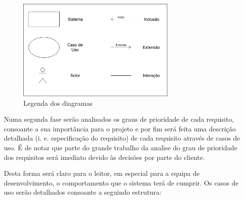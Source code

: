 \begin{figure}[ht!]
	\begin{center}
		\includegraphics[width=0.7\textwidth]{img/rf/legenda}
		\caption{Legenda dos diagramas}
		\label{fig:rf-legenda}
	\end{center}
\end{figure}

Numa segunda fase serão analisados os graus de prioridade de cada requisito, consoante a sua importância para o projeto e por fim será feita uma descrição detalhada (i. e. especificação do requisito) de cada requisito através de casos de uso. É de notar que parte do grande trabalho da analise do grau de prioridade dos requisitos será imediato devido às decisões por parte do cliente.

Desta forma será claro para o leitor, em especial para a equipa de desenvolvimento, o comportamento que o sistema terá de cumprir. Os casos de uso serão detalhados consoante a seguindo estrutura:

